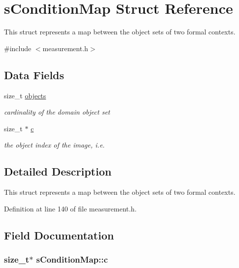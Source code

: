 \hypertarget{structsConditionMap}{\section{s\-Condition\-Map \-Struct \-Reference}
\label{structsConditionMap}
}


\-This struct represents a map between the object sets of two formal contexts.  




{\ttfamily \#include $<$measurement.\-h$>$}

\subsection*{\-Data \-Fields}
\begin{DoxyCompactItemize}
\item 
size\-\_\-t \hyperlink{structsConditionMap_aba0e3734a3c3c6de4f39d9a6c72f3cca}{objects}
\begin{DoxyCompactList}\small\item\em cardinality of the domain object set \end{DoxyCompactList}\item 
size\-\_\-t $\ast$ \hyperlink{structsConditionMap_a8fba8e129aa41cc4fd2f1898e83c2f28}{c}
\begin{DoxyCompactList}\small\item\em the object index of the image, i.\-e. \end{DoxyCompactList}\end{DoxyCompactItemize}


\subsection{\-Detailed \-Description}
\-This struct represents a map between the object sets of two formal contexts. 

\-Definition at line 140 of file measurement.\-h.



\subsection{\-Field \-Documentation}
\hypertarget{structsConditionMap_a8fba8e129aa41cc4fd2f1898e83c2f28}{
\subsubsection[{c}]{\setlength{\rightskip}{0pt plus 5cm}size\-\_\-t$\ast$ {\bf s\-Condition\-Map\-::c}}}\label{structsConditionMap_a8fba8e129aa41cc4fd2f1898e83c2f28}


